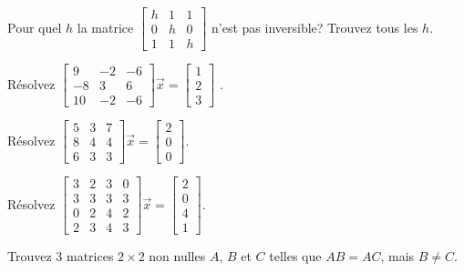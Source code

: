 \begin{exercise}
Pour quel $h$ la matrice
$\left[ \begin{smallmatrix}
h & 1 & 1 \\
0 & h & 0 \\
1 & 1 & h
\end{smallmatrix} \right]$
n’est pas inversible? Trouvez tous les $h$.
\end{exercise}

\begin{exercise}
Résolvez
$\left[ \begin{smallmatrix}
9 & -2 & -6 \\
-8 & 3 & 6 \\
10 & -2 & -6
\end{smallmatrix} \right] \vec{x} =
\left[ \begin{smallmatrix}
1 \\
2 \\
3
\end{smallmatrix} \right]$ .
\end{exercise}

\begin{exercise}
Résolvez
$\left[ \begin{smallmatrix}
5 & 3 & 7 \\
8 & 4 & 4 \\
6 & 3 & 3
\end{smallmatrix} \right] \vec{x} =
\left[ \begin{smallmatrix}
2 \\
0 \\
0
\end{smallmatrix} \right]$.
\end{exercise}

\begin{exercise}
Résolvez
$\left[ \begin{smallmatrix}
3 & 2 & 3 & 0 \\
3 & 3 & 3 & 3 \\
0 & 2 & 4 & 2 \\
2 & 3 & 4 & 3 
\end{smallmatrix} \right] \vec{x} =
\left[ \begin{smallmatrix}
2 \\
0 \\
4 \\
1
\end{smallmatrix} \right]$.
\end{exercise}

\begin{exercise}
Trouvez 3 matrices $2 \times 2$ non nulles $A$, $B$ et $C$ telles que
$AB = AC$, mais $B \not= C$.
\end{exercise}

